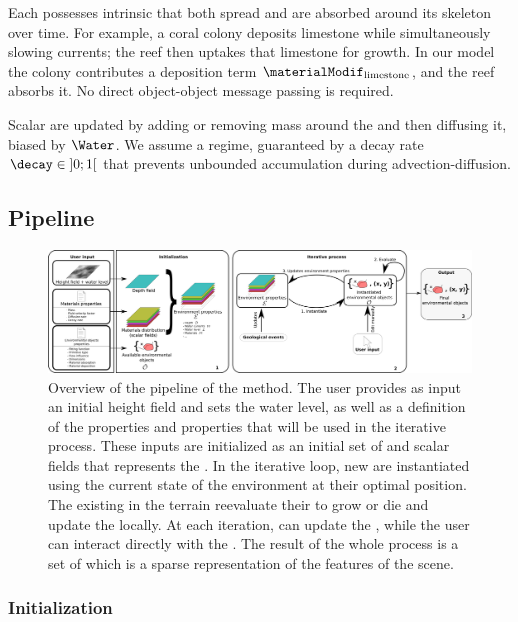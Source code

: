 Each  possesses intrinsic  that both spread and are absorbed around its skeleton over time. For example, a coral colony deposits limestone while simultaneously slowing currents; the reef then uptakes that limestone for growth.  
In our model the colony contributes a deposition term $\materialModif_{\text{limestone}}$, and the reef absorbs it. No direct object-object message passing is required.

Scalar  are updated by adding or removing mass around the  and then diffusing it, biased by $\Water$. 
We assume a  regime, guaranteed by a decay rate~$\decay \in\;]0; 1[$ that prevents unbounded accumulation during advection-diffusion.

\subsection{Pipeline}

\begin{figure}[H]
    \includegraphics{pipeline.pdf}
    \caption{Overview of the pipeline of the method. The user provides as input an initial height field and sets the water level, as well as a definition of the  properties and  properties that will be used in the iterative process. These inputs are initialized as an initial set of  and scalar fields that represents the . In the iterative loop, new  are instantiated using the current state of the environment at their optimal position. The existing  in the terrain reevaluate their  to grow or die and update the  locally. At each iteration,  can update the , while the user can interact directly with the . The result of the whole process is a set of  which is a sparse representation of the features of the scene. }
    \label{fig:env-obj_pipeline}
\end{figure}

\subsubsection{Initialization}

